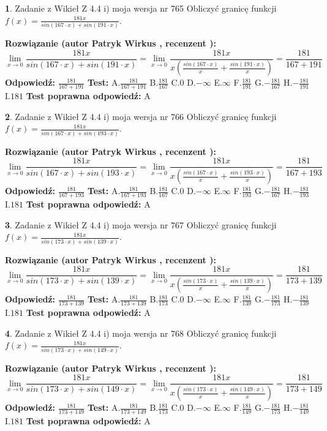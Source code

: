 \documentclass[12pt, a4paper]{article}
\theoremstyle{definition} %
\newtheorem{zad}{}
\newcommand{\zadStart}[1]{\begin{zad}#1\newline}
\newcommand{\zadStop}{\end{zad}}
\newcommand{\rozwStart}[2]{\noindent \textbf{Rozwiązanie (autor #1 , recenzent #2): }\newline}
\newcommand{\rozwStop}{\newline}
\newcommand{\odpStart}{\noindent \textbf{Odpowiedź:}\newline}
\newcommand{\odpStop}{\newline}
\newcommand{\testStart}{\noindent \textbf{Test:}\newline}
\newcommand{\testStop}{\newline}
\newcommand{\kluczStart}{\noindent \textbf{Test poprawna odpowiedź:}\newline}
\newcommand{\kluczStop}{\newline}
\begin{document}
\zadStart{Zadanie z Wikieł Z 4.4 i) moja wersja nr 765}
Obliczyć granicę funkcji $f(x)=\frac{181x}{sin(167\cdot x) +sin(191\cdot x)}$.
\zadStop
\rozwStart{Patryk Wirkus}{}
$$\lim\limits_{x\to 0}\frac{181x}{sin(167\cdot x) +sin(191\cdot x)}=\lim\limits_{x\to 0}\frac{181x}{x(\frac{sin(167\cdot x)}{x}+\frac{sin(191\cdot x)}{x})}=\frac{181}{167+191}$$
\rozwStop
\odpStart
$\frac{181}{167+191}$
\odpStop
\testStart
A.$\frac{181}{167+191}$
B.$\frac{181}{167}$
C.$0$
D.$-\infty$
E.$\infty$
F.$\frac{181}{191}$
G.$-\frac{181}{167}$
H.$-\frac{181}{191}$
I.$181$
\testStop
\kluczStart
A
\kluczStop



\zadStart{Zadanie z Wikieł Z 4.4 i) moja wersja nr 766}
Obliczyć granicę funkcji $f(x)=\frac{181x}{sin(167\cdot x) +sin(193\cdot x)}$.
\zadStop
\rozwStart{Patryk Wirkus}{}
$$\lim\limits_{x\to 0}\frac{181x}{sin(167\cdot x) +sin(193\cdot x)}=\lim\limits_{x\to 0}\frac{181x}{x(\frac{sin(167\cdot x)}{x}+\frac{sin(193\cdot x)}{x})}=\frac{181}{167+193}$$
\rozwStop
\odpStart
$\frac{181}{167+193}$
\odpStop
\testStart
A.$\frac{181}{167+193}$
B.$\frac{181}{167}$
C.$0$
D.$-\infty$
E.$\infty$
F.$\frac{181}{193}$
G.$-\frac{181}{167}$
H.$-\frac{181}{193}$
I.$181$
\testStop
\kluczStart
A
\kluczStop



\zadStart{Zadanie z Wikieł Z 4.4 i) moja wersja nr 767}
Obliczyć granicę funkcji $f(x)=\frac{181x}{sin(173\cdot x) +sin(139\cdot x)}$.
\zadStop
\rozwStart{Patryk Wirkus}{}
$$\lim\limits_{x\to 0}\frac{181x}{sin(173\cdot x) +sin(139\cdot x)}=\lim\limits_{x\to 0}\frac{181x}{x(\frac{sin(173\cdot x)}{x}+\frac{sin(139\cdot x)}{x})}=\frac{181}{173+139}$$
\rozwStop
\odpStart
$\frac{181}{173+139}$
\odpStop
\testStart
A.$\frac{181}{173+139}$
B.$\frac{181}{173}$
C.$0$
D.$-\infty$
E.$\infty$
F.$\frac{181}{139}$
G.$-\frac{181}{173}$
H.$-\frac{181}{139}$
I.$181$
\testStop
\kluczStart
A
\kluczStop



\zadStart{Zadanie z Wikieł Z 4.4 i) moja wersja nr 768}
Obliczyć granicę funkcji $f(x)=\frac{181x}{sin(173\cdot x) +sin(149\cdot x)}$.
\zadStop
\rozwStart{Patryk Wirkus}{}
$$\lim\limits_{x\to 0}\frac{181x}{sin(173\cdot x) +sin(149\cdot x)}=\lim\limits_{x\to 0}\frac{181x}{x(\frac{sin(173\cdot x)}{x}+\frac{sin(149\cdot x)}{x})}=\frac{181}{173+149}$$
\rozwStop
\odpStart
$\frac{181}{173+149}$
\odpStop
\testStart
A.$\frac{181}{173+149}$
B.$\frac{181}{173}$
C.$0$
D.$-\infty$
E.$\infty$
F.$\frac{181}{149}$
G.$-\frac{181}{173}$
H.$-\frac{181}{149}$
I.$181$
\testStop
\kluczStart
A
\kluczStop
\end{document}
